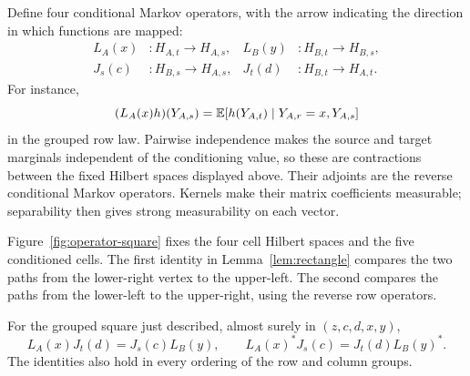 Define four conditional Markov operators, with the arrow indicating the
direction in which functions are mapped:
\begin{equation}\label{eq:square-operators}
\begin{aligned}
 L_A(x)&:H_{A,t}\longrightarrow H_{A,s},&
 L_B(y)&:H_{B,t}\longrightarrow H_{B,s},\\
 J_s(c)&:H_{B,s}\longrightarrow H_{A,s},&
 J_t(d)&:H_{B,t}\longrightarrow H_{A,t}.
\end{aligned}
\end{equation}
For instance,
\[
 (L_A(x)h)(Y_{A,s})
 =\mathbb E[h(Y_{A,t})\mid Y_{A,r}=x,Y_{A,s}]
\]
in the grouped row law.  Pairwise independence makes the source and
target marginals independent of the conditioning value, so these are
contractions between the fixed Hilbert spaces displayed above.
Their adjoints are the reverse conditional Markov operators.  Kernels
make their matrix coefficients measurable; separability then gives
strong measurability on each vector.

Figure~\ref{fig:operator-square} fixes the four cell Hilbert spaces and
the five conditioned cells. The first identity in
Lemma~\ref{lem:rectangle} compares the two paths from the lower-right
vertex to the upper-left. The second compares the paths from the
lower-left to the upper-right, using the reverse row operators.


\begin{lemma}\label{lem:rectangle}
For the grouped square just described, almost surely in $(z,c,d,x,y)$,
\begin{equation}\label{eq:rectangle-identities}
 L_A(x)J_t(d)=J_s(c)L_B(y),\qquad
 L_A(x)^*J_s(c)=J_t(d)L_B(y)^*.
\end{equation}
The identities also hold in every ordering of the row and column groups.
\end{lemma}

